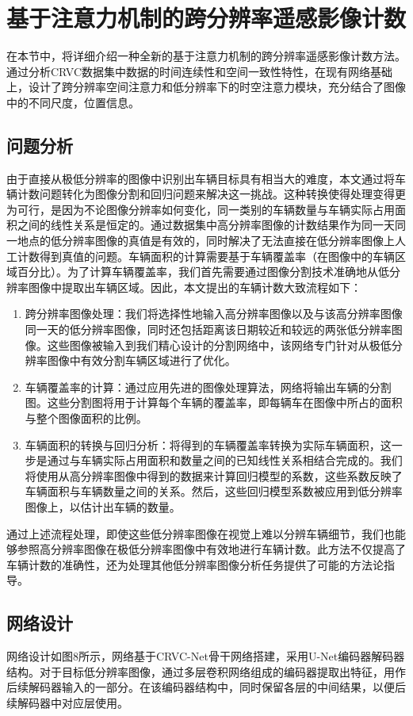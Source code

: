 
\chapter{基于注意力机制的跨分辨率遥感影像计数}
在本节中，将详细介绍一种全新的基于注意力机制的跨分辨率遥感影像计数方法。通过分析CRVC数据集中数据的时间连续性和空间一致性特性，在现有网络基础上，设计了跨分辨率空间注意力和低分辨率下的时空注意力模块，充分结合了图像中的不同尺度，位置信息。
\section{问题分析}
由于直接从极低分辨率的图像中识别出车辆目标具有相当大的难度，本文通过将车辆计数问题转化为图像分割和回归问题来解决这一挑战。这种转换使得处理变得更为可行，是因为不论图像分辨率如何变化，同一类别的车辆数量与车辆实际占用面积之间的线性关系是恒定的。通过数据集中高分辨率图像的计数结果作为同一天同一地点的低分辨率图像的真值是有效的，同时解决了无法直接在低分辨率图像上人工计数得到真值的问题。车辆面积的计算需要基于车辆覆盖率（在图像中的车辆区域百分比）。为了计算车辆覆盖率，我们首先需要通过图像分割技术准确地从低分辨率图像中提取出车辆区域。因此，本文提出的车辆计数大致流程如下：
\begin{enumerate}    
\item 跨分辨率图像处理：我们将选择性地输入高分辨率图像以及与该高分辨率图像同一天的低分辨率图像，同时还包括距离该日期较近和较远的两张低分辨率图像。这些图像被输入到我们精心设计的分割网络中，该网络专门针对从极低分辨率图像中有效分割车辆区域进行了优化。
\item 车辆覆盖率的计算：通过应用先进的图像处理算法，网络将输出车辆的分割图。这些分割图将用于计算每个车辆的覆盖率，即每辆车在图像中所占的面积与整个图像面积的比例。
\item 车辆面积的转换与回归分析：将得到的车辆覆盖率转换为实际车辆面积，这一步是通过与车辆实际占用面积和数量之间的已知线性关系相结合完成的。我们将使用从高分辨率图像中得到的数据来计算回归模型的系数，这些系数反映了车辆面积与车辆数量之间的关系。然后，这些回归模型系数被应用到低分辨率图像上，以估计出车辆的数量。
\end{enumerate}
通过上述流程处理，即使这些低分辨率图像在视觉上难以分辨车辆细节，我们也能够参照高分辨率图像在极低分辨率图像中有效地进行车辆计数。此方法不仅提高了车辆计数的准确性，还为处理其他低分辨率图像分析任务提供了可能的方法论指导。
\section{网络设计}
网络设计如图8所示，网络基于CRVC-Net骨干网络搭建，采用U-Net编码器解码器结构。对于目标低分辨率图像，通过多层卷积网络组成的编码器提取出特征，用作后续解码器输入的一部分。在该编码器结构中，同时保留各层的中间结果，以便后续解码器中对应层使用。


